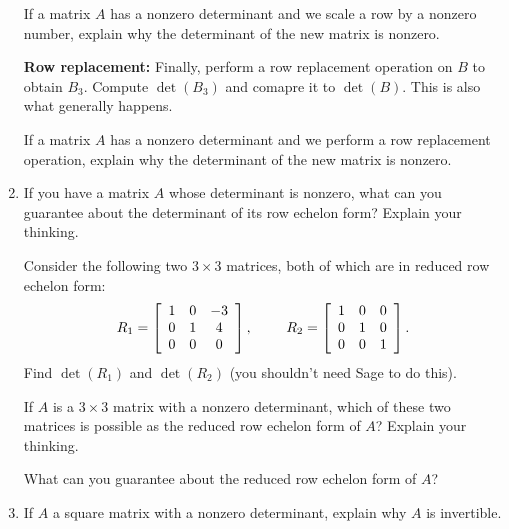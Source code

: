 \documentclass[12pt]{article}
\newcommand{\vs}[1]{\vspace{#1in}}
\begin{document}
\begin{enumerate}
  \vs{1}
  If a matrix $A$ has a nonzero determinant and we scale a row by a
  nonzero number, explain why the determinant of the new matrix is
  nonzero.

  \vs{1}
  \newpage
  {\bf Row replacement:} Finally, perform a row replacement
  operation on $B$ to obtain $B_3$.  Compute $\det(B_3)$ and comapre
  it to $\det(B)$.  This is also what generally happens.

  \vs{1}
  If a matrix $A$ has a nonzero determinant and we perform a row
  replacement operation, explain why the determinant of the new matrix
  is nonzero.

  \vs{1}
  
\item If you have a matrix $A$ whose determinant is nonzero, what can
  you guarantee about the determinant of its row echelon form?
  Explain your thinking.

  \vs{1}
  Consider the following two $3\times3$ matrices, both of which are in
  reduced row echelon form:
  $$
  R_1 =
  \left[
    \begin{array}{ccc}
      1 & 0 & -3 \\
      0 & 1 & 4 \\
      0 & 0 & 0 \\
    \end{array}
  \right],\hspace*{24pt}
  R_2 =
  \left[
    \begin{array}{ccc}
      1 & 0 & 0 \\
      0 & 1 & 0 \\
      0 & 0 & 1 \\
    \end{array}
  \right].
  $$
  Find $\det(R_1)$ and $\det(R_2)$ (you shouldn't need Sage to do
  this).

  \vs{1}

  If $A$ is a $3\times3$ matrix with a nonzero determinant, which of
  these two matrices is possible as the
  reduced row echelon form of $A$?  Explain your thinking.

  \vs{1}
  What can you guarantee about the reduced row echelon form of $A$?

  \vs{1}
  \newpage
\item If $A$ a square matrix with a nonzero determinant, explain why $A$
  is invertible.
  
\end{enumerate}
\end{document}
